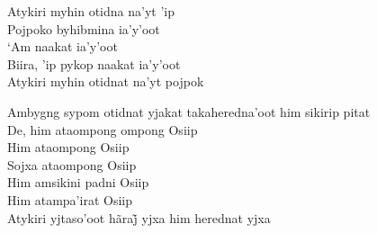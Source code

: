 \begin{linenumbers}\begingroup\raggedright
 
\noindent   Atykiri myhin otidna na'yt 'ip\\
  Pojpoko byhibmina ia'y'oot\\
  `Am naakat ia'y'oot\\
  Biira, 'ip pykop naakat ia'y'oot\\
  Atykiri myhin otidnat na'yt pojpok
 
\end{linenumbers}\endgroup

\bigskip

\begin{linenumbers}\begingroup\raggedright
 
\noindent   Ambygng sypom otidnat yjakat takaheredna'oot him sikirip pitat\\
  De, him ataompong ompong Osiip\\
  Him ataompong Osiip\\
  Sojxa ataompong Osiip\\
  Him amsikini padni Osiip\\
  Him atampa'irat Osiip\\
  Atykiri yjtaso’oot hãraj̃ yjxa him herednat yjxa
 
\end{linenumbers}\endgroup

\bigskip

